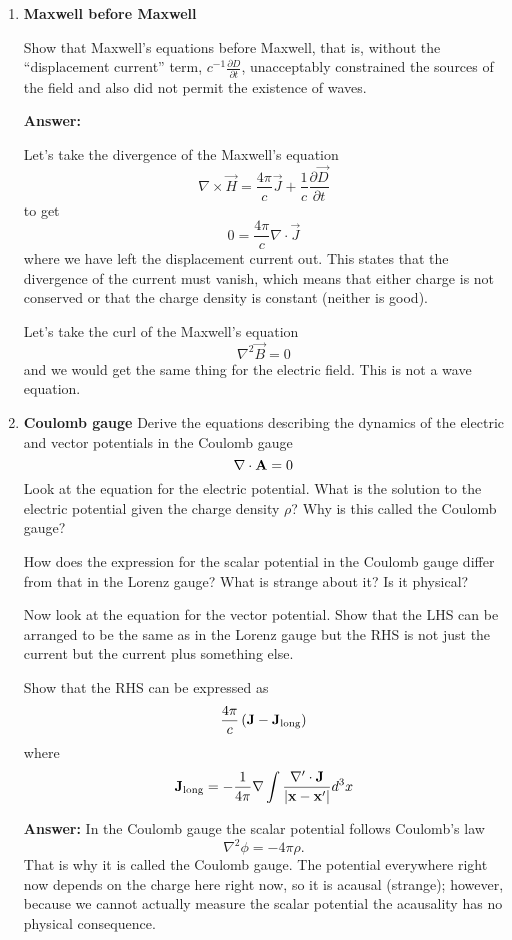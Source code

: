 \documentclass{article}
\begin{document}
\begin{enumerate}
\item{\bf Maxwell before Maxwell}

Show that Maxwell's equations before Maxwell, that is, without the
``displacement current'' term, $c^{-1} \frac{\partial D}{\partial t}$, unacceptably constrained the
sources of the field and also did not permit the existence of waves.

{\bf Answer:}

Let's take the divergence of the Maxwell's equation
\begin{equation}
{\nabla} \times {\vec H} = \frac{4\pi}{c} {\vec J} +\frac{1}{c} 
\frac{\partial \vec D}{\partial t} 
\end{equation}
to get
\begin{equation}
0 = \frac{4\pi}{c} \nabla \cdot {\vec J} 
\end{equation}
where we have left the displacement current out.  This states that the
divergence of the current must vanish, which means that either charge
is not conserved or that the charge density is constant (neither is
good).

Let's take the curl of the Maxwell's equation
\begin{equation}
{\nabla}^2 {\vec B} = 0
\end{equation}
and we would get the same thing for the electric field.  This is not a
wave equation.

\item {\bf Coulomb gauge} 
Derive the equations describing the dynamics of the electric and
vector potentials in the Coulomb gauge
$$
\nabla \cdot {\bf A} = 0
$$
Look at the equation for the electric potential. What is the solution
to the electric potential given the charge density $\rho$? Why is this
called the Coulomb gauge?

How does the expression for the scalar potential in the Coulomb gauge
differ from that in the Lorenz gauge? What is strange about it? Is it
physical?

Now look at the equation for the vector potential. Show that the LHS
can be arranged to be the same as in the Lorenz gauge but the RHS is
not just the current but the current plus something else.

Show that the RHS can be expressed as 
$$
\frac{4\pi}{c} \left ( {\bf J} - {\bf J}_{\hbox{\rm \scriptsize long}} \right ) 
$$
where
$$
{\bf J}_{\hbox{\rm \scriptsize long}} = -\frac{1}{4\pi} \nabla \int \frac{\nabla' \cdot
{\bf J}}{|{\bf x}-{\bf x}'|} d^3 x
$$

{\bf Answer:}
In the Coulomb gauge the scalar potential follows Coulomb's law
$$
\nabla^2 \phi = -4\pi \rho.
$$
That is why it is called the Coulomb gauge.  The potential everywhere
right now depends on the charge here right now, so it is acausal
(strange); however, because we cannot actually measure the scalar
potential the acausality has no physical consequence.


\end{enumerate}
\end{document}
